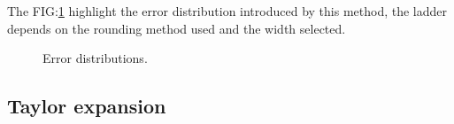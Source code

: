 \documentclass[12pt]{article}
\begin{document}
The FIG:\ref{fig:LUT_Error} highlight the error distribution introduced by this method, the ladder depends on the rounding method used and the width selected.
\begin{figure}[h]
    \begin{minipage}[c]{0.5\linewidth}
        \vspace{0pt}
        \centering
    \end{minipage}%
    \hfill%
    \begin{minipage}[c]{0.5\linewidth}
        \vspace{0pt}
        \centering
    \end{minipage}%
    \caption{Error distributions.}
    \label{fig:LUT_Error}
\end{figure}


\newpage

\subsection{Taylor expansion}
\end{document}
